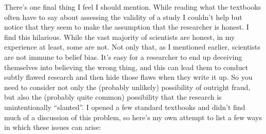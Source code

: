 There's one final thing I feel I should mention. While reading what the textbooks often have to say about assessing the validity of a study I couldn't help but notice that they seem to  make the assumption that the researcher is honest. I find this hilarious. While the vast majority of scientists are honest, in my experience at least, some are not. Not only that, as I mentioned earlier, scientists are not immune to belief bias. It's easy for a researcher to end up deceiving themselves into believing the wrong thing, and this can lead them to conduct subtly flawed research and then hide those flaws when they write it up. So you need to consider not only the (probably unlikely) possibility of outright fraud, but also the (probably quite common) possibility that the research is unintentionally ``slanted''. I opened a few standard textbooks and didn't find much of a discussion of this problem, so here's my own attempt to list a few ways in which these issues can arise:

